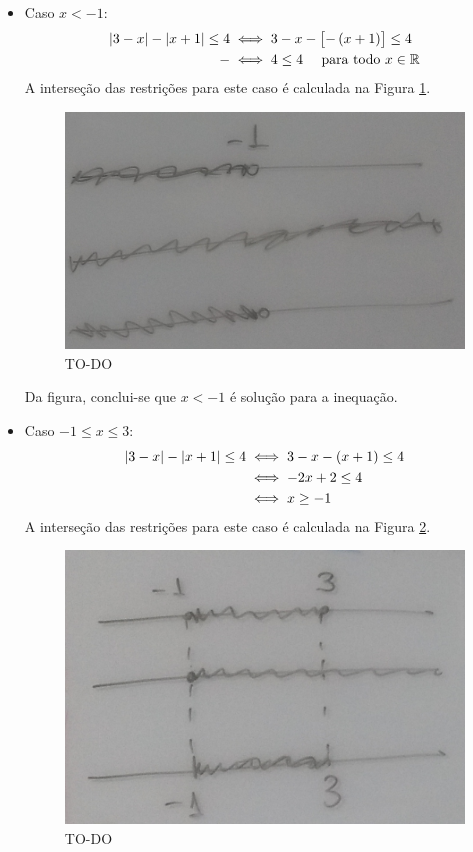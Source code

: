 \begin{solution}
\begin{enumerate}[(a)]
	\begin{itemize}
		\item Caso $x<-1$:
		\begin{align*}
			\modu{3-x}-\modu{x+1}\le4 & \iff 3-x-\left[-\prn{x+1}\right]\le 4\\
				-					  & \iff 4 \le 4 \ \ \ \ \text{para todo } x \in \R
		\end{align*}
		A interseção das restrições para este caso é calculada na Figura \ref{fig:08-28-cut1}.
		\begin{figure}[H]
		\caption{TO-DO}
		\label{fig:08-28-cut1} %
		\includegraphics[scale=0.3]{../../res/img/cut1.jpg}
		\centering
		\end{figure}
		Da figura, conclui-se que $x<-1$ é solução para a inequação.
		\item Caso $-1 \le x \le 3$:
		\begin{align*}
		\left|3-x\right| - \left|x+1\right| \le 4 & \iff 3-x-\left(x+1\right) \le 4 \\
		& \iff -2x+2\le 4\\ 
		& \iff x \ge -1
		\end{align*}
		A interseção das restrições para este caso é calculada na Figura \ref{fig:08-28-cut2}.
		\begin{figure}[H]
		\caption{TO-DO}
		\label{fig:08-28-cut2} 
		\includegraphics[scale=0.3]{../../res/img/cut2.jpg}

\end{figure}
\end{itemize}
\end{enumerate}
\end{solution}
